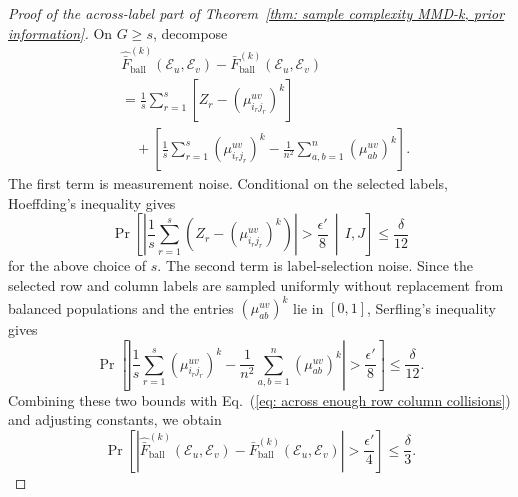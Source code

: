 \documentclass[aps,prx,reprint,superscriptaddress,amsmath,amssymb,longbibliography,floatfix]{revtex4-2}
\newcommand{\Abs}[1]{\left\lvert #1\right\rvert}
\newcommand{\scE}{\mathcal{E}}
\theoremstyle{plain}
\theoremstyle{definition}
\theoremstyle{remark}
\begin{document}
\begin{proof}[Proof of the across-label part of Theorem~\ref{thm: sample complexity MMD-k, prior information}]
    On $G\ge s$, decompose
    \begin{align}
&\widehat{\bar F}^{(k)}_{\mathrm{ball}}(\scE_u,\scE_v)
        -
        \bar F^{(k)}_{\mathrm{ball}}(\scE_u,\scE_v)
        \nonumber\\
    &=
        \frac1s\sum_{r=1}^s
        \left[
            Z_r
            -
            \left(\mu_{i_rj_r}^{uv}\right)^k
        \right] \nonumber\\
        &\quad+
        \left[
            \frac1s\sum_{r=1}^s
            \left(\mu_{i_rj_r}^{uv}\right)^k
            -
            \frac1{n^2}\sum_{a,b=1}^n
            \left(\mu_{ab}^{uv}\right)^k
        \right].
\end{align}
    The first term is measurement noise. Conditional on the selected labels, Hoeffding's inequality gives
    \begin{equation}
        \Pr\!\left[
            \Abs{
                \frac1s\sum_{r=1}^s
                \left(
                    Z_r
                    -
                    \left(\mu_{i_rj_r}^{uv}\right)^k
                \right)
            }
            >
            \frac{\epsilon'}8
            \,\middle|\,
            I,J
        \right]
        \le
        \frac{\delta}{12}
    \end{equation}
    for the above choice of $s$. The second term is label-selection noise. Since the selected row and column labels are sampled uniformly without replacement from balanced populations and the entries $(\mu_{ab}^{uv})^k$ lie in $[0,1]$, Serfling's inequality gives
    \begin{equation}
        \Pr\!\left[
            \Abs{
                \frac1s\sum_{r=1}^s
                \left(\mu_{i_rj_r}^{uv}\right)^k
                -
                \frac1{n^2}\sum_{a,b=1}^n
                \left(\mu_{ab}^{uv}\right)^k
            }
            >
            \frac{\epsilon'}8
        \right]
        \le
        \frac{\delta}{12}.
    \end{equation}
    Combining these two bounds with Eq.~(\ref{eq: across enough row column collisions}) and adjusting constants, we obtain
    \begin{equation}
        \Pr\!\left[
            \Abs{
                \widehat{\bar F}^{(k)}_{\mathrm{ball}}(\scE_u,\scE_v)
                -
                \bar F^{(k)}_{\mathrm{ball}}(\scE_u,\scE_v)
            }
            >
            \frac{\epsilon'}4
        \right]
        \le
        \frac{\delta}{3}.
        \label{eq: across one F term}
    \end{equation}


\end{proof}
\end{document}
